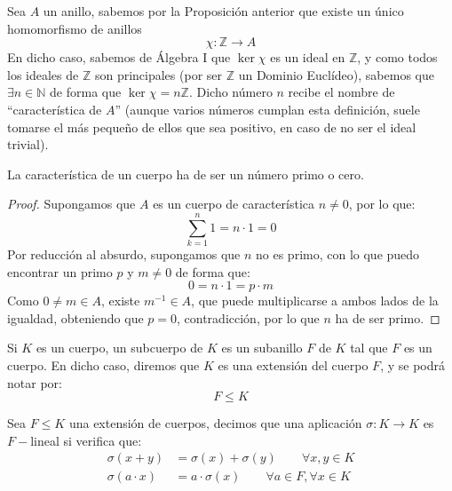 \begin{definicion}
    Sea $A$ un anillo, sabemos por la Proposición anterior que existe un único homomorfismo de anillos 
    \begin{equation*}
        \chi:\mathbb{Z}\to A
    \end{equation*}
    En dicho caso, sabemos de Álgebra I que $\ker\chi$ es un ideal en $\mathbb{Z}$, y como todos los ideales de $\mathbb{Z}$ son principales (por ser $\mathbb{Z}$ un Dominio Euclídeo), sabemos que $\exists n\in \mathbb{N}$ de forma que $\ker\chi = n\mathbb{Z}$. Dicho número $n$ recibe el nombre de ``característica de $A$'' (aunque varios números cumplan esta definición, suele tomarse el más pequeño de ellos que sea positivo, en caso de no ser el ideal trivial).
\end{definicion}

\begin{prop}
    La característica de un cuerpo ha de ser un número primo o cero.
    \begin{proof}
        Supongamos que $A$ es un cuerpo de característica $n\neq 0$, por lo que:
        \begin{equation*}
            \sum_{k=1}^{n}1 = n\cdot 1 = 0
        \end{equation*}
        Por reducción al absurdo, supongamos que $n$ no es primo, con lo que puedo encontrar un primo $p$ y $m\neq 0$ de forma que:
        \begin{equation*}
            0 = n\cdot 1 = p\cdot m
        \end{equation*}
        Como $0\neq m \in A$, existe $m^{-1}\in A$, que puede multiplicarse a ambos lados de la igualdad, obteniendo que $p = 0$, contradicción, por lo que $n$ ha de ser primo.
    \end{proof}
\end{prop}

\begin{definicion}
    Si $K$ es un cuerpo, un subcuerpo de $K$ es un subanillo $F$ de $K$ tal que $F$ es un cuerpo. En dicho caso, diremos que $K$ es una extensión del cuerpo $F$, y se podrá notar por:
    \begin{equation*}
        F\leq K
    \end{equation*}
\end{definicion}

\begin{definicion}
    Sea $F\leq K$ una extensión de cuerpos, decimos que una aplicación $\sigma:K\to K$ es $F-$lineal si verifica que:
    \begin{align*}
        \sigma(x+y) &= \sigma(x) + \sigma(y) \qquad \forall x,y\in K \\
        \sigma(a\cdot x) &= a\cdot \sigma(x) \qquad \forall a\in F, \forall x\in K
    \end{align*}
\end{definicion}

